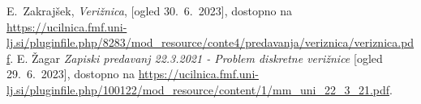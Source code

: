 \documentclass{article}
\begin{document}

\begin{thebibliography}{9}
        E.~Zakrajšek, \emph{Verižnica}, [ogled 30.~6.~2023], dostopno na \url{https://ucilnica.fmf.uni-lj.si/pluginfile.php/8283/mod_resource/conte4/predavanja/veriznica/veriznica.pdf}.
        E. Žagar \emph{Zapiski predavanj 22.3.2021 - Problem diskretne verižnice} [ogled 29.~6.~2023], dostopno na \url{https://ucilnica.fmf.uni-lj.si/pluginfile.php/100122/mod_resource/content/1/mm_uni_22_3_21.pdf}.
\end{thebibliography}
\end{document}
